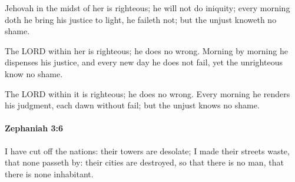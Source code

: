			\begin{versebox}
					\item[BHS] 
					\item[LXX] 
					\item[ASV] Jehovah in the midst of her is righteous; he will not do iniquity; every morning doth he bring his justice to light, he faileth not; but the unjust knoweth no shame.
					\item[NIV] The LORD within her is righteous; he does no wrong. Morning by morning he dispenses his justice, and every new day he does not fail, yet the unrighteous know no shame.
					\item[NRSV] The LORD within it is righteous; he does no wrong. Every morning he renders his judgment, each dawn without fail; but the unjust knows no shame.
			\end{versebox}

		\paragraph{Zephaniah 3:6} %
			\label{ZEPHANIAH-3-6}

			I have cut off the nations: their towers are desolate; I made their streets waste, that none passeth by: their cities are destroyed, so that there is no man, that there is none inhabitant.

